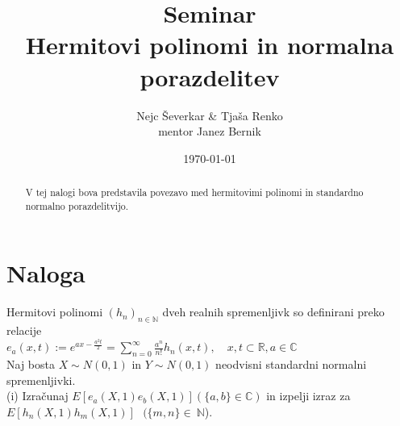 \documentclass[ letterpaper, titlepage, fleqn]{article}
\begin{document}
\title{Seminar \\ Hermitovi polinomi in normalna porazdelitev}
\author{Nejc Ševerkar \& Tjaša Renko \\ mentor Janez Bernik}
\date{\today}
\maketitle

\begin{abstract}
\begin{center}
V tej nalogi bova predstavila povezavo med hermitovimi polinomi
in standardno normalno porazdelitvijo.
\end{center}
\end{abstract}

\section*{Naloga}
Hermitovi polinomi $(h_n)_{n \in \mathbb{N}}$ dveh realnih spremenljivk
so definirani preko relacije \\[10px]
$e_a(x, t) := e^{ax -\frac{a^2t}{2}} = \sum_{n=0}^{\infty} \frac{a^n}{n!} h_n(x, t), 
\quad {x, t} \subset \mathbb{R}, a \in \mathbb{C}$ \\[10px]
Naj bosta $X \sim N(0, 1)$ in $Y \sim N(0, 1)$ neodvisni standardni normalni spremenljivki. \\[10px]
(i) Izračunaj $E[e_a(X,1) e_b(X,1)] (\{a,b\} \in \mathbb{C}) $ in izpelji izraz za $ E[h_n(X,1) h_m(X,1)] \text{ } (\{m,n\}\in ~ \mathbb{N} $).\\
\end{document}
